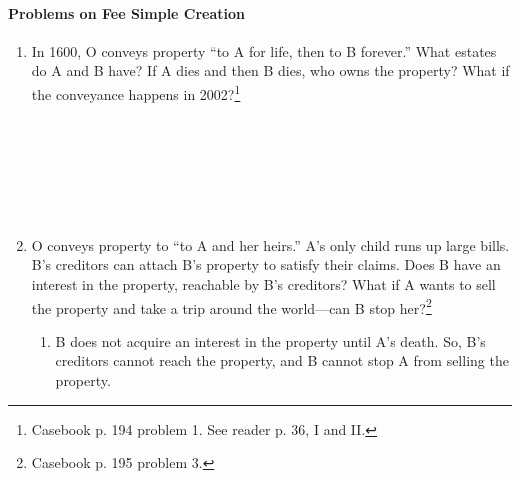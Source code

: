 \paragraph{Problems on Fee Simple Creation}

\begin{enumerate}
    \item In 1600, O conveys property ``to A for life, then to B forever.'' 
    What estates do A and B have? If A dies and then B dies, who owns the 
    property? What if the conveyance happens in 2002?\footnote{Casebook p. 194 
    problem 1. See reader p. 36, I and II.} %
    ~\\\\\\\\\\\\\\
    \item O conveys property to ``to A and her heirs.'' A's only child runs up 
    large bills. B's creditors can attach B's property to satisfy their 
    claims. Does B have an interest in the property, reachable by B's 
    creditors? What if A wants to sell the property and take a trip around the 
    world---can B stop her?\footnote{Casebook p. 195 problem 3.} %
    \begin{enumerate}
        \item B does not acquire an interest in the property until A's death. 
        So, B's creditors cannot reach the property, and B cannot stop A from 
        selling the property.
    \end{enumerate}

\end{enumerate}

% 
% 
% 
